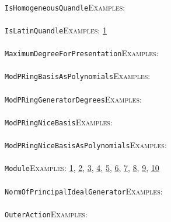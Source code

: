 \documentclass[a4paper,11pt]{report}
\begin{document}
{{ \\
 \texttt{IsHomogeneousQuandle}{\nobreakspace}{\nobreakspace}{\nobreakspace}{\nobreakspace}\textsc{Examples:} \\
 \\
 \texttt{IsLatinQuandle}{\nobreakspace}{\nobreakspace}{\nobreakspace}{\nobreakspace}\textsc{Examples:} \href{../www/SideLinks/About/aboutQuandles.html} {1}{\nobreakspace} \\
 \\
 \texttt{MaximumDegreeForPresentation}{\nobreakspace}{\nobreakspace}{\nobreakspace}{\nobreakspace}\textsc{Examples:} \\
 \\
 \texttt{ModPRingBasisAsPolynomials}{\nobreakspace}{\nobreakspace}{\nobreakspace}{\nobreakspace}\textsc{Examples:} \\
 \\
 \texttt{ModPRingGeneratorDegrees}{\nobreakspace}{\nobreakspace}{\nobreakspace}{\nobreakspace}\textsc{Examples:} \\
 \\
 \texttt{ModPRingNiceBasis}{\nobreakspace}{\nobreakspace}{\nobreakspace}{\nobreakspace}\textsc{Examples:} \\
 \\
 \texttt{ModPRingNiceBasisAsPolynomials}{\nobreakspace}{\nobreakspace}{\nobreakspace}{\nobreakspace}\textsc{Examples:} \\
 \\
 \texttt{Module}{\nobreakspace}{\nobreakspace}{\nobreakspace}{\nobreakspace}\textsc{Examples:} \href{tutorial/chap10.html} {1}{\nobreakspace}, \href{../www/SideLinks/About/aboutAbelianCategories.html} {2}{\nobreakspace}, \href{../www/SideLinks/About/aboutNonabelian.html} {3}{\nobreakspace}, \href{../www/SideLinks/About/aboutPeriodic.html} {4}{\nobreakspace}, \href{../www/SideLinks/About/aboutCoefficientSequence.html} {5}{\nobreakspace}, \href{../www/SideLinks/About/aboutCrossedMods.html} {6}{\nobreakspace}, \href{../www/SideLinks/About/aboutGouter.html} {7}{\nobreakspace}, \href{../www/SideLinks/About/aboutIntro.html} {8}{\nobreakspace}, \href{../www/SideLinks/About/aboutTorAndExt.html} {9}{\nobreakspace}, \href{../www/SideLinks/About/aboutTwistedCoefficients.html} {10}{\nobreakspace} \\
 \\
 \texttt{NormOfPrincipalIdealGenerator}{\nobreakspace}{\nobreakspace}{\nobreakspace}{\nobreakspace}\textsc{Examples:} \\
 \\
 \texttt{OuterAction}{\nobreakspace}{\nobreakspace}{\nobreakspace}{\nobreakspace}\textsc{Examples:} \\
}}
\end{document}
